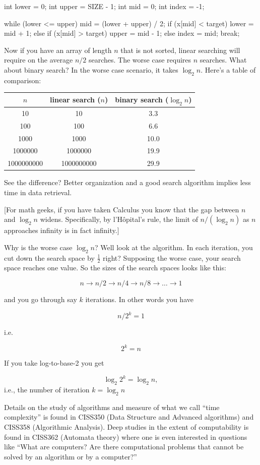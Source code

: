\begin{consolethree}[escapeinside=||]
int lower = 0;
int upper = SIZE - 1;
int mid = 0;
int index = -1;

while (lower <= upper)
{
    mid = (lower + upper) / 2;
    if (x[mid] < target)
    {
        lower = mid + 1;
    }
    else if (x[mid] > target)
    {
        upper = mid - 1;
    }
    else
    {
        index = mid;
        break;
    }
}
\end{consolethree}

Now if you have an array of length $n$ that is not sorted, linear searching will require on the average $n/2$ searches. The worse case requires $n$ searches. What about binary search? In the worse case scenario, it takes $\log_{2}n$. Here's a table of comparison:

\begin{center}
\begin{tabular}{|c|c|c|}
\hline
$n$ & linear search ($n$) & binary search ($\log_{2}n$) \\
\hline
10 & 10 & 3.3 \\
100 & 100 & 6.6 \\
1000 & 1000 & 10.0 \\
1000000 & 1000000 & 19.9 \\
1000000000 & 1000000000 & 29.9 \\
\hline
\end{tabular}
\end{center}

See the difference? Better organization and a good search algorithm implies less time in data retrieval.

[For math geeks, if you have taken Calculus you know that the gap between $n$ and $\log_{2}n$ widens. Specifically, by l'H\^{o}pital's rule, the limit of $n/(\log_{2}n)$ as $n$ approaches infinity is in fact infinity.]

Why is the worse case $\log_{2}n$? Well look at the algorithm. In each iteration, you cut down the search space by $\frac{1}{2}$ right? Supposing the worse case, your search space reaches one value. So the sizes of the search spaces looks like this:
\begin{center}
\[n \rightarrow n/2 \rightarrow n/4 \rightarrow n/8 \rightarrow \ldots \rightarrow 1\]
\end{center}
and you go through say $k$ iterations. In other words you have
\begin{center}
\[n/2^{k} = 1\]
\end{center}
i.e.
\begin{center}
\[2^{k} = n\]
\end{center}
If you take log-to-base-2 you get
\begin{center}
\[\log_{2}2^{k} = \log_{2}n,\]
i.e., the number of iteration $k = \log_{2}n$
\end{center}
Details on the study of algorithms and measure of what we call ``time complexity'' is found in CISS350 (Data Structure and Advanced algorithms) and CISS358 (Algorithmic Analysis). Deep studies in the extent of computability is found in CISS362 (Automata theory) where one is even interested in questions like ``What are computers? Are there computational problems that cannot be solved by an algorithm or by a computer?''

